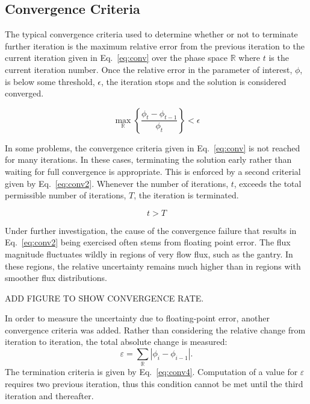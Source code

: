 \subsection{Convergence Criteria}
The typical convergence criteria used to determine whether or not to terminate further iteration is the maximum relative error from the previous iteration to the current iteration given in Eq.~\ref{eq:conv} over the phase space $\mathbb{R}$ where $t$ is the current iteration number. Once the relative error in the parameter of interest, $\phi$, is below some threshold, $\epsilon$, the iteration stops and the solution is considered converged.

\begin{equation}\label{eq:conv}
\max_{\mathbb{R}} \left\{ \frac{\phi_t - \phi_{t-1}}{\phi_t} \right\} < \epsilon
\end{equation}

In some problems, the convergence criteria given in Eq.~\ref{eq:conv} is not reached for many iterations. In these cases, terminating the solution early rather than waiting for full convergence is appropriate. This is enforced by a second criterial given by Eq.~\ref{eq:conv2}. Whenever the number of iterations, $t$, exceeds the total permissible number of iterations, $T$, the iteration is terminated.

\begin{equation}\label{eq:conv2}
t > T
\end{equation}

Under further investigation, the cause of the convergence failure that results in Eq.~\ref{eq:conv2} being exercised often stems from floating point error. The flux magnitude fluctuates wildly in regions of very flow flux, such as the gantry. In these regions, the relative uncertainty remains much higher than in regions with smoother flux distributions. 

ADD FIGURE TO SHOW CONVERGENCE RATE.

In order to measure the uncertainty due to floating-point error, another convergence criteria was added. Rather than considering the relative change from iteration to iteration, the total absolute change is measured:
\begin{equation}\label{eq:conv3}
\varepsilon = \sum_{\mathbb{R}} |\phi_i - \phi_{i-1}|.
\end{equation}
The termination criteria is given by Eq.~\ref{eq:conv4}. Computation of a value for $\varepsilon$ requires two previous iteration, thus this condition cannot be met until the third iteration and thereafter.

